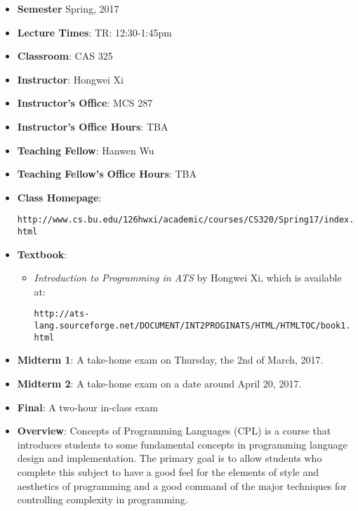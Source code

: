 \documentclass[11pt]{article}
\begin{document}
\begin{itemize}
\item {\bf Semester} Spring, 2017

\item {\bf Lecture Times}: TR: 12:30-1:45pm

\item {\bf Classroom}: CAS 325

\item {\bf Instructor}: Hongwei Xi
\item {\bf Instructor's Office}: MCS 287
\item {\bf Instructor's Office Hours}: TBA

\item {\bf Teaching Fellow}: Hanwen Wu
\item {\bf Teaching Fellow's Office Hours}: TBA

\item {\bf Class Homepage}:\\
\centerline{%
\texttt{http://www.cs.bu.edu/\char126hwxi/academic/courses/CS320/Spring17/index.html}%
}%

\item {\bf Textbook}:\kern6pt
\begin{itemize}
\item
{\em Introduction to Programming in ATS} by Hongwei Xi, which is available at:
\begin{center}
\texttt{http://ats-lang.sourceforge.net/DOCUMENT/INT2PROGINATS/HTML/HTMLTOC/book1.html}
\end{center}
\end{itemize}

\item
{\bf Midterm 1}\kern6pt:
A take-home exam on Thursday, the 2nd of March, 2017.

\item
{\bf Midterm 2}\kern6pt:
A take-home exam on a date around April 20, 2017.

\item {\bf Final}:\kern6pt A two-hour in-class exam

\item {\bf Overview}:
Concepts of Programming Languages (CPL) is a course that introduces
students to some fundamental concepts in programming language design and
implementation. The primary goal is to allow students who complete this
subject to have a good feel for the elements of style and aesthetics of
programming and a good command of the major techniques for controlling
complexity in programming.


\end{itemize}
\end{document}
